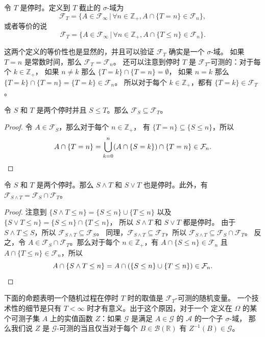 \documentclass[fontset=none]{Notes}
\begin{document}
\begin{definition}
  令 $T$ 是停时。定义到 $T$ 截止的 $\sigma$-域为
  \[
    \mathcal{F}_T=\{A\in \mathcal{F}_\infty\,|\, \forall n\in \mathbb{Z}_+, A\cap \{T=n\}\in \mathcal{F}_n \},
  \]
  或者等价的说
  \[
    \mathcal{F}_T=\{A\in \mathcal{F}_\infty\,|\, \forall n\in \mathbb{Z}_+, A\cap \{T\leq n\}\in \mathcal{F}_n \}.
  \]
\end{definition}

这两个定义的等价性也是显然的，并且可以验证 $\mathcal{F}_T$ 确实是一个 $\sigma$-域。
如果 $T=n$ 是常数时间，那么 $\mathcal{F}_T=\mathcal{F}_n$。
还可以注意到停时 $T$ 是 $\mathcal{F}_T$-可测的：对于每个 $k\in \mathbb{Z}_+$，
如果 $n\neq k$ 那么 $\{T=k\}\cap \{T=n\}=\emptyset$，
如果 $n=k$ 那么 $\{T=k\}\cap \{T=n\}=\{T=k\}\in \mathcal{F}_n$。
所以对于每个 $k\in \mathbb{Z}_+$，都有 $\{T=k\}\in \mathcal{F}_T$。

\begin{proposition}
  令 $S$ 和 $T$ 是两个停时并且 $S\leq T$。那么 $\mathcal{F}_S\subseteq \mathcal{F}_T$。
\end{proposition}
\begin{proof}
  令 $A\in \mathcal{F}_S$，那么对于每个 $n\in \mathbb{Z}_+$，
  有 $\{T=n\}\subseteq \{S\leq n\}$，所以
  \[
    A\cap \{T=n\}= \bigcup_{k=0}^n (A\cap \{S=k\})\cap \{T=n\}\in \mathcal{F}_n.\qedhere
  \]
\end{proof}

\begin{proposition}
  令 $S$ 和 $T$ 是两个停时。那么 $S\wedge T$ 和 $S\vee T$ 也是停时。此外，有
  $\mathcal{F}_{S\wedge T}=\mathcal{F}_S\cap \mathcal{F}_T$。
\end{proposition}
\begin{proof}
  注意到 $\{S\wedge T\leq n\}=\{S\leq n\}\cup \{T\leq n\}$
  以及 $\{S\vee T\leq n\}=\{S\leq n\}\cap \{T\leq n\}$，
  所以 $S\wedge T$ 和 $S\vee T$ 都是停时。
  由于 $S\wedge T\leq S$，所以 $\mathcal{F}_{S\wedge T}\subseteq \mathcal{F}_S$。
  同理，$\mathcal{F}_{S\wedge T}\subseteq \mathcal{F}_T$，所以
  $\mathcal{F}_{S\wedge T}\subseteq \mathcal{F}_S\cap \mathcal{F}_T$。
  反之，令 $A\in \mathcal{F}_S\cap \mathcal{F}_T$。那么对于每个 $n\in \mathbb{Z}_+$，有
  $A\cap \{S\leq n\}\in \mathcal{F}_n$ 且 $A\cap \{T\leq n\}\in \mathcal{F}_n$，所以
  \[
    A\cap \{S\wedge T\leq n\}=A\cap (\{S\leq n\}\cup \{T\leq n\})\in \mathcal{F}_n.\qedhere
  \]
\end{proof}

下面的命题表明一个随机过程在停时 $T$ 时的取值是 $\mathcal{F}_T$-可测的随机变量。
一个技术性的细节是只有 $T<\infty$ 时才有意义。出于这个原因，对于一个
定义在 $\Omega$ 的某个可测子集 $A$ 上的实值函数 $Z$：如果 $\mathcal{G}$
是满足 $A\in \mathcal{G}$ 的 $\mathcal{A}$ 的一个子 $\sigma$-域，
那么我们说 $Z$ 是 $\mathcal{G}$-可测的当且仅当对于每个 $B\in \mathcal{B}(\mathbb{R})$
有 $Z^{-1}(B)\in \mathcal{G}$。
\end{document}
